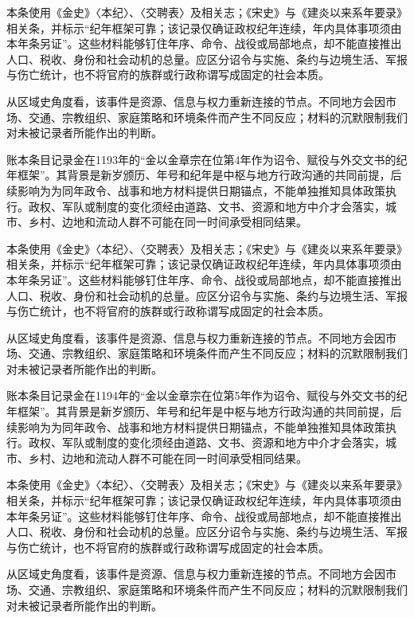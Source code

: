 本条使用《金史》〈本纪〉、〈交聘表〉及相关志；《宋史》与《建炎以来系年要录》相关条，并标示“纪年框架可靠；该记录仅确证政权纪年连续，年内具体事项须由本年条另证”。这些材料能够钉住年序、命令、战役或局部地点，却不能直接推出人口、税收、身份和社会动机的总量。应区分诏令与实施、条约与边境生活、军报与伤亡统计，也不将官府的族群或行政称谓写成固定的社会本质。

从区域史角度看，该事件是资源、信息与权力重新连接的节点。不同地方会因市场、交通、宗教组织、家庭策略和环境条件而产生不同反应；材料的沉默限制我们对未被记录者所能作出的判断。

账本条目记录金在1193年的“金以金章宗在位第4年作为诏令、赋役与外交文书的纪年框架”。其背景是新岁颁历、年号和纪年是中枢与地方行政沟通的共同前提，后续影响为为同年政令、战事和地方材料提供日期锚点，不能单独推知具体政策执行。政权、军队或制度的变化须经由道路、文书、资源和地方中介才会落实，城市、乡村、边地和流动人群不可能在同一时间承受相同结果。

本条使用《金史》〈本纪〉、〈交聘表〉及相关志；《宋史》与《建炎以来系年要录》相关条，并标示“纪年框架可靠；该记录仅确证政权纪年连续，年内具体事项须由本年条另证”。这些材料能够钉住年序、命令、战役或局部地点，却不能直接推出人口、税收、身份和社会动机的总量。应区分诏令与实施、条约与边境生活、军报与伤亡统计，也不将官府的族群或行政称谓写成固定的社会本质。

从区域史角度看，该事件是资源、信息与权力重新连接的节点。不同地方会因市场、交通、宗教组织、家庭策略和环境条件而产生不同反应；材料的沉默限制我们对未被记录者所能作出的判断。

账本条目记录金在1194年的“金以金章宗在位第5年作为诏令、赋役与外交文书的纪年框架”。其背景是新岁颁历、年号和纪年是中枢与地方行政沟通的共同前提，后续影响为为同年政令、战事和地方材料提供日期锚点，不能单独推知具体政策执行。政权、军队或制度的变化须经由道路、文书、资源和地方中介才会落实，城市、乡村、边地和流动人群不可能在同一时间承受相同结果。

本条使用《金史》〈本纪〉、〈交聘表〉及相关志；《宋史》与《建炎以来系年要录》相关条，并标示“纪年框架可靠；该记录仅确证政权纪年连续，年内具体事项须由本年条另证”。这些材料能够钉住年序、命令、战役或局部地点，却不能直接推出人口、税收、身份和社会动机的总量。应区分诏令与实施、条约与边境生活、军报与伤亡统计，也不将官府的族群或行政称谓写成固定的社会本质。

从区域史角度看，该事件是资源、信息与权力重新连接的节点。不同地方会因市场、交通、宗教组织、家庭策略和环境条件而产生不同反应；材料的沉默限制我们对未被记录者所能作出的判断。

